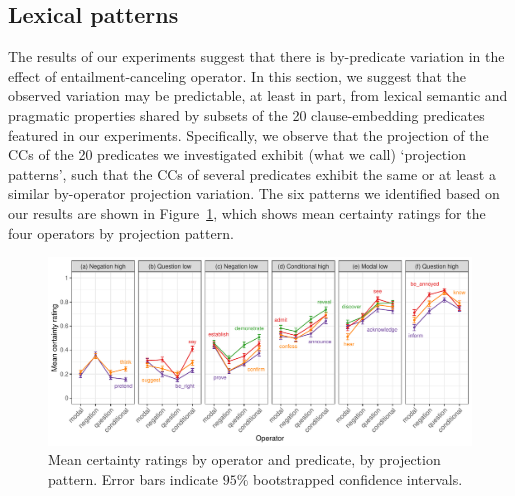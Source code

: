 \documentclass[a4paper,12pt,twoside]{article}
\begin{document}
\subsection{Lexical patterns}\label{s:lex}

The results of our experiments suggest that there is by-predicate variation in the effect of entailment-canceling operator. In this section, we suggest that the observed variation may be predictable, at least in part, from lexical semantic and pragmatic properties shared by subsets of the 20 clause-embedding predicates featured in our experiments. Specifically, we observe that the projection of the CCs of the 20 predicates we investigated exhibit (what we call) `projection patterns', such that the CCs of several predicates exhibit the same or at least a similar by-operator projection variation. The six patterns we identified based on our results are shown in Figure~\ref{fig:patterns}, which shows mean certainty ratings for the four operators by projection pattern.
    
    
	
	\begin{figure}[ht]
		\centering
		\includegraphics[width=\textwidth]{predicate-profiles.pdf}
		\caption{Mean certainty ratings by operator and predicate, by projection pattern. Error bars indicate $95\%$ bootstrapped confidence intervals.}
		\label{fig:patterns}
	\end{figure}
\end{document}
